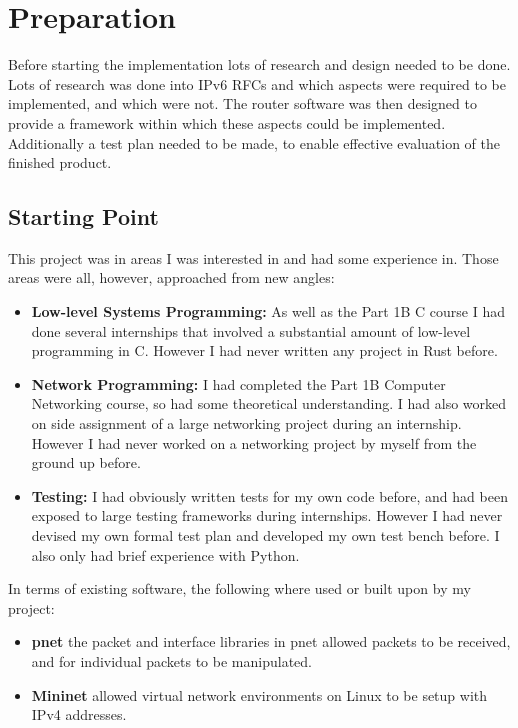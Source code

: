 \documentclass[12pt,a4paper,twoside,openright]{report}
\begin{document}
\chapter{Preparation}
\label{chap::preperation}

Before starting the implementation lots of research and design needed to be done. Lots of research was done into IPv6 RFCs and which aspects were required to be implemented, and which were not. The router software was then designed to provide a framework within which these aspects could be implemented.  Additionally a test plan needed to be made, to enable effective evaluation of the finished product.

\section{Starting Point}
This project was in areas I was interested in and had some experience in. Those areas were all, however, approached from new angles:
\begin{itemize}
\item \textbf{Low-level Systems Programming:} As well as the Part 1B C course I had done several internships that involved a substantial amount of low-level programming in C. However I had never written any project in Rust before.
\item \textbf{Network Programming:} I had completed the Part 1B Computer Networking course, so had some theoretical understanding.  I had also worked on side assignment of a large networking project during an internship.  However I had never worked on a networking project by myself from the ground up before.
\item \textbf{Testing:} I had obviously written tests for my own code before, and had been exposed to large testing frameworks during internships.  However I had never devised my own formal test plan and developed my own test bench before. I also only had brief experience with Python.
\end{itemize}
In terms of existing software, the following where used or built upon by my project:
\begin{itemize}
\item \textbf{pnet}\cite{pnet_rust} the packet and interface libraries in pnet allowed packets to be received, and for individual packets to be manipulated.
\item \textbf{Mininet}\cite{mininet} allowed virtual network environments on Linux to be setup with IPv4 addresses.
\end{itemize}
\end{document}
